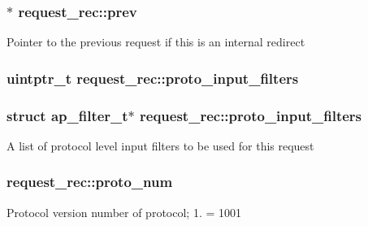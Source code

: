\subsubsection[{\texorpdfstring{prev}{prev}}]{$\ast$ request\+\_\+rec\+::prev}\hypertarget{structrequest__rec_a34f57e963ccdf850e8d70241f1a92e65}{}\label{structrequest__rec_a34f57e963ccdf850e8d70241f1a92e65}
Pointer to the previous request if this is an internal redirect 
\subsubsection[{\texorpdfstring{proto\+\_\+input\+\_\+filters}{proto_input_filters}}]{\setlength{\rightskip}{0pt plus 5cm}uintptr\+\_\+t request\+\_\+rec\+::proto\+\_\+input\+\_\+filters}\hypertarget{structrequest__rec_af1d131cbf9a8564874b4196bff89121c}{}\label{structrequest__rec_af1d131cbf9a8564874b4196bff89121c}
\subsubsection[{\texorpdfstring{proto\+\_\+input\+\_\+filters}{proto_input_filters}}]{\setlength{\rightskip}{0pt plus 5cm}struct {\bf ap\+\_\+filter\+\_\+t}$\ast$ request\+\_\+rec\+::proto\+\_\+input\+\_\+filters}\hypertarget{structrequest__rec_a4fafa030728d5bea176e8acaa38112d9}{}\label{structrequest__rec_a4fafa030728d5bea176e8acaa38112d9}
A list of protocol level input filters to be used for this request 
\subsubsection[{\texorpdfstring{proto\+\_\+num}{proto_num}}]{ request\+\_\+rec\+::proto\+\_\+num}\hypertarget{structrequest__rec_aac9666ac729394665b8a7bd854336029}{}\label{structrequest__rec_aac9666ac729394665b8a7bd854336029}
Protocol version number of protocol; 1. = 1001 
